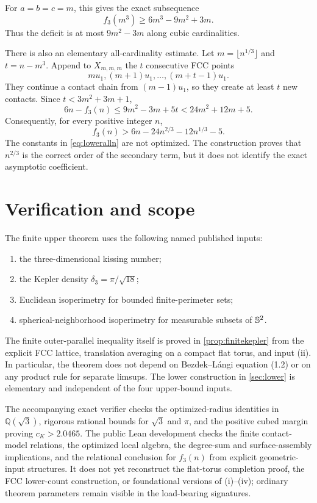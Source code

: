 For $a=b=c=m$, this gives the exact subsequence
\begin{equation}\label{eq:lowercube}
 \boxed{
 f_3(m^3)\ge6m^3-9m^2+3m.}
\end{equation}
Thus the deficit is at most $9m^2-3m$ along cubic cardinalities.

There is also an elementary all-cardinality estimate.  Let
$m=\lfloor n^{1/3}\rfloor$ and $t=n-m^3$.  Append to $X_{m,m,m}$ the $t$
consecutive FCC points
\[
 mu_1,(m+1)u_1,\ldots,(m+t-1)u_1.
\]
They continue a contact chain from $(m-1)u_1$, so they create at least $t$ new
contacts.  Since $t<3m^2+3m+1$,
\[
 6n-f_3(n)
 \le9m^2-3m+5t
 <24m^2+12m+5.
\]
Consequently, for every positive integer $n$,
\begin{equation}\label{eq:loweralln}
 \boxed{
 f_3(n)>6n-24n^{2/3}-12n^{1/3}-5.}
\end{equation}
The constants in \cref{eq:loweralln} are not optimized.  The construction proves
that $n^{2/3}$ is the correct order of the secondary term, but it does not identify
the exact asymptotic coefficient.

\section{Verification and scope}

The finite upper theorem uses the following named published inputs:
\begin{enumerate}[label=(\roman*),leftmargin=2.2em]
\item the three-dimensional kissing number;
\item the Kepler density $\delta_3=\pi/\sqrt{18}$;
\item Euclidean isoperimetry for bounded finite-perimeter sets;
\item spherical-neighborhood isoperimetry for measurable subsets of $\mathbb S^2$.
\end{enumerate}
The finite outer-parallel inequality itself is proved in
\cref{prop:finitekepler} from the explicit FCC lattice, translation averaging on
a compact flat torus, and input (ii).  In particular, the theorem does not depend
on Bezdek--L\'angi equation (1.2) or on any product rule for separate limsups.
The lower construction in \cref{sec:lower} is elementary and independent of the
four upper-bound inputs.

The accompanying exact verifier checks the optimized-radius identities in
$\mathbb Q(\sqrt3)$, rigorous rational bounds for $\sqrt3$ and $\pi$, and the
positive cubed margin proving $c_K>2.0465$.  The public Lean development checks the
finite contact-model relations, the optimized local algebra, the degree-sum and
surface-assembly implications, and the relational conclusion for $f_3(n)$ from
explicit geometric-input structures.  It does not yet reconstruct the flat-torus
completion proof, the FCC lower-count construction, or foundational versions of
(i)--(iv); ordinary theorem parameters remain visible in the load-bearing
signatures.


